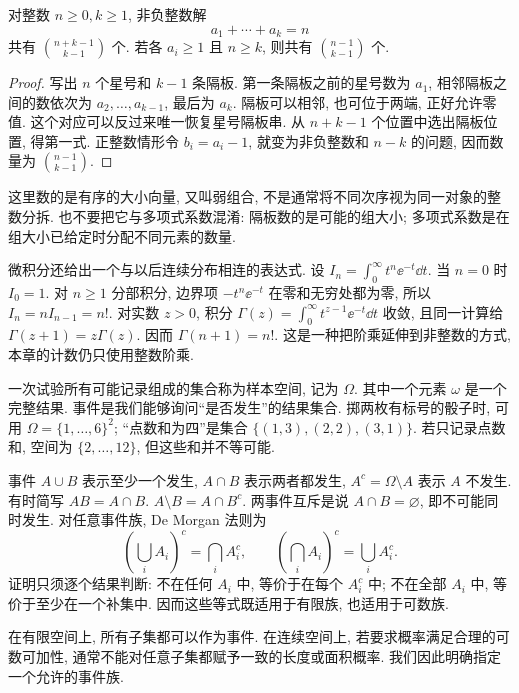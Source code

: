 \begin{proposition}[隔板计数]
对整数 $n\geq0,k\geq1$, 非负整数解
\[
 a_1+\cdots+a_k=n
\]
共有 $\binom{n+k-1}{k-1}$ 个. 若各 $a_i\geq1$ 且 $n\geq k$, 则共有 $\binom{n-1}{k-1}$ 个.
\end{proposition}
\begin{proof}
写出 $n$ 个星号和 $k-1$ 条隔板. 第一条隔板之前的星号数为 $a_1$, 相邻隔板之间的数依次为 $a_2,\ldots,a_{k-1}$, 最后为 $a_k$. 隔板可以相邻, 也可位于两端, 正好允许零值. 这个对应可以反过来唯一恢复星号隔板串. 从 $n+k-1$ 个位置中选出隔板位置, 得第一式. 正整数情形令 $b_i=a_i-1$, 就变为非负整数和 $n-k$ 的问题, 因而数量为 $\binom{n-1}{k-1}$.
\end{proof}
这里数的是有序的大小向量, 又叫弱组合, 不是通常将不同次序视为同一对象的整数分拆. 也不要把它与多项式系数混淆: 隔板数的是可能的组大小; 多项式系数是在组大小已给定时分配不同元素的数量.

\begin{remark}[阶乘与积分]
微积分还给出一个与以后连续分布相连的表达式. 设 $I_n=\int_0^\infty t^n\ee^{-t}\dd t$. 当 $n=0$ 时 $I_0=1$. 对 $n\geq1$ 分部积分, 边界项 $-t^n\ee^{-t}$ 在零和无穷处都为零, 所以 $I_n=nI_{n-1}=n!$. 对实数 $z>0$, 积分 $\Gamma(z)=\int_0^\infty t^{z-1}\ee^{-t}\dd t$ 收敛, 且同一计算给 $\Gamma(z+1)=z\Gamma(z)$. 因而 $\Gamma(n+1)=n!$. 这是一种把阶乘延伸到非整数的方式, 本章的计数仍只使用整数阶乘.
\end{remark}

一次试验所有可能记录组成的集合称为样本空间, 记为 $\Omega$. 其中一个元素 $\omega$ 是一个完整结果. 事件是我们能够询问``是否发生''的结果集合. 掷两枚有标号的骰子时, 可用 $\Omega=\{1,\ldots,6\}^2$; ``点数和为四''是集合 $\{(1,3),(2,2),(3,1)\}$. 若只记录点数和, 空间为 $\{2,\ldots,12\}$, 但这些和并不等可能.

事件 $A\cup B$ 表示至少一个发生, $A\cap B$ 表示两者都发生, $A^c=\Omega\setminus A$ 表示 $A$ 不发生. 有时简写 $AB=A\cap B$. $A\setminus B=A\cap B^c$. 两事件互斥是说 $A\cap B=\varnothing$, 即不可能同时发生. 对任意事件族, De Morgan 法则为
\[
 \left(\bigcup_i A_i\right)^c=\bigcap_i A_i^c,\qquad
 \left(\bigcap_i A_i\right)^c=\bigcup_i A_i^c.
\]
证明只须逐个结果判断: 不在任何 $A_i$ 中, 等价于在每个 $A_i^c$ 中; 不在全部 $A_i$ 中, 等价于至少在一个补集中. 因而这些等式既适用于有限族, 也适用于可数族.

在有限空间上, 所有子集都可以作为事件. 在连续空间上, 若要求概率满足合理的可数可加性, 通常不能对任意子集都赋予一致的长度或面积概率. 我们因此明确指定一个允许的事件族.

